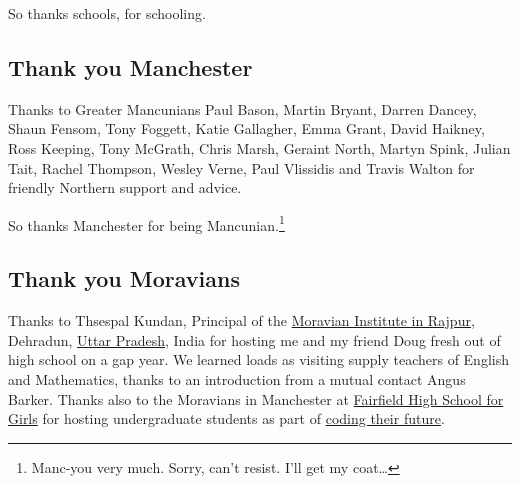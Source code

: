 \documentclass[
]{book}
\begin{document}
So thanks schools, for schooling. 🙏

\hypertarget{mancs}{%
\subsection{Thank you Manchester}\label{mancs}}

Thanks to Greater Mancunians Paul Bason, Martin Bryant, Darren Dancey, Shaun Fensom, Tony Foggett, Katie Gallagher, Emma Grant, David Haikney, Ross Keeping, Tony McGrath, Chris Marsh, Geraint North, Martyn Spink, Julian Tait, Rachel Thompson, Wesley Verne, Paul Vlissidis and Travis Walton for friendly Northern support and advice.

So thanks Manchester for being Mancunian.\footnote{Manc-you very much. Sorry, can't resist. I'll get my coat\ldots{}} 🙏

\hypertarget{moravians}{%
\subsection{Thank you Moravians}\label{moravians}}

Thanks to Thsespal Kundan, Principal of the \href{https://moravianinstitute.com/}{Moravian Institute in Rajpur}, Dehradun, \href{https://en.wikipedia.org/wiki/Uttar_Pradesh}{Uttar Pradesh}, India for hosting me and my friend Doug fresh out of high school on a gap year. We learned loads as visiting supply teachers of English and Mathematics, thanks to an introduction from a mutual contact Angus Barker. Thanks also to the Moravians in Manchester at \href{https://en.wikipedia.org/wiki/Fairfield_High_School_for_Girls}{Fairfield High School for Girls} for hosting undergraduate students as part of \href{http://www.cs.man.ac.uk/~hulld/coding-their-future.html}{coding their future}.
\end{document}
